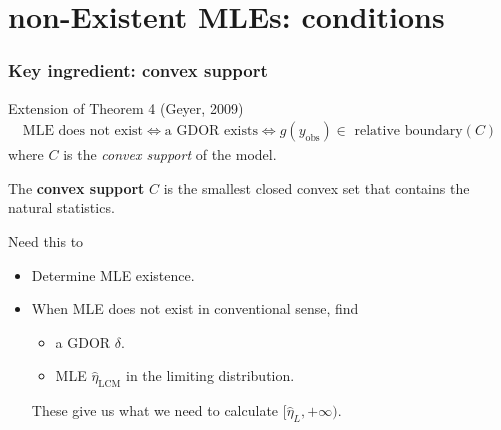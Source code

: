 \documentclass[ 10pt]{beamer}
\newcommand{\etaLCM}{\hat{\eta}_{\textrm{LCM}}}
\newcommand{\yobs}{y_{\text{obs}}}
\begin{document}
\section{non-Existent MLEs: conditions}
\frame
{
  \frametitle{Key ingredient: convex support}  
\begin{block}{Extension of Theorem 4 (Geyer, 2009)}
\begin{align*}
\text{MLE does not exist} \iff \text{a GDOR exists} \iff \text{$g(\yobs) \in$ relative boundary$(C)$}
\end{align*}
where  $C$ is the \emph{convex support} of the model.
\end{block}
\vspace{2mm}

The \textbf{convex support} $C$ is the smallest closed convex set that contains the natural statistics.
\vspace{2mm}

\pause
Need this to
\begin{itemize}
\item Determine MLE existence.
\item When MLE does not exist in conventional sense, find
\begin{itemize}
	\item	a GDOR $\delta$.
	\item 	MLE $\etaLCM$ in the limiting distribution.
\end{itemize}
	These give us what we need to calculate $[\hat{\eta}_L, +\infty)$.
\end{itemize}

}
\end{document}
